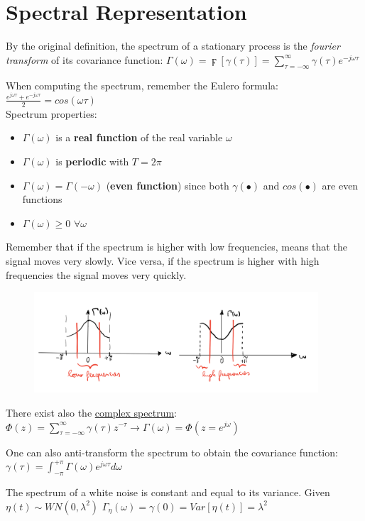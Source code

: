 \documentclass[10pt,a4paper]{article}
\begin{document}
\section{Spectral Representation}
By the original definition, the spectrum of a stationary process is the \textit{fourier transform} of its covariance function:
\center
 $\Gamma(\omega)=\digamma[\gamma(\tau)]=\sum_{\tau=-\infty}^{\infty} \gamma(\tau)e^{-j \omega \tau}$
 \\
 \vspace{0.5em}
 \raggedright
 When computing the spectrum, remember the Eulero formula:
 $\frac{e^{j \omega \tau}+e^{-j \omega \tau}}{2} = cos(\omega \tau)$
 \\
 Spectrum properties:
 \begin{itemize}
 	\item $\Gamma(\omega)$ is a \textbf{real function} of the real variable $\omega$
 	\item $\Gamma(\omega)$ is \textbf{periodic} with $T=2 \pi$
 	\item $\Gamma(\omega) =\Gamma(-\omega)$ (\textbf{even function}) since both $\gamma(\bullet)$ and $cos(\bullet)$ are even functions
 	\item $\Gamma(\omega) \geq 0$  $\forall \omega$
 \end{itemize}
 Remember that if the spectrum is higher with low frequencies, means that the signal moves very slowly. Vice versa, if the spectrum is higher with high frequencies the signal moves very quickly. 
 \begin{figure}[h!]
 \hfill \includegraphics[width=300pt]{images/spectrum.png}\hspace*{\fill}
  \label{fig:spectrum}
\end{figure}
 There exist also the \uline{complex spectrum}:
 \center
 $\Phi (z)=\sum_{\tau=-\infty}^{\infty} \gamma (\tau)z^{-\tau} \rightarrow \Gamma(\omega)=\Phi(z=e^{j \omega})$
 \\
 \raggedright
 \vspace{0.5em}
 One can also anti-transform the spectrum to obtain the covariance function:
  \center
 $\gamma(\tau)=\int_{-\pi}^{+\pi} \Gamma(\omega)e^{j \omega \tau} d\omega$
 \\
 \vspace{0.5em}
 \raggedright
  The spectrum of a white noise is constant and equal to its variance.
 Given  $\eta(t) \sim WN(0,\lambda^2)$
 \center 
$\Gamma_\eta(\omega) = \gamma(0) = Var[\eta(t)] = \lambda^2$
\\
\raggedright
\end{document}
